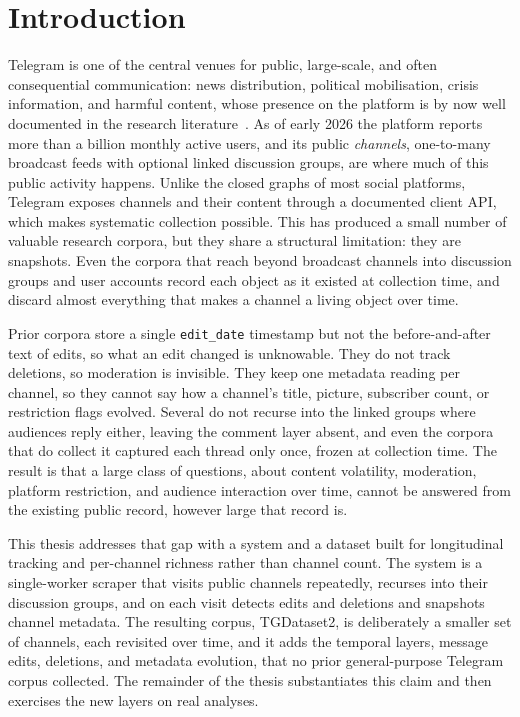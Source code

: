 \chapter{Introduction}
\label{chap:introduction}

Telegram is one of the central venues for public, large-scale, and often consequential communication: news distribution, political mobilisation, crisis information, and harmful content, whose presence on the platform is by now well documented in the research literature~\cite{baumgartner2020,walther2021,hoseini2024,propaganda2025}. As of early 2026 the platform reports more than a billion monthly active users, and its public \emph{channels}, one-to-many broadcast feeds with optional linked discussion groups, are where much of this public activity happens. Unlike the closed graphs of most social platforms, Telegram exposes channels and their content through a documented client API, which makes systematic collection possible. This has produced a small number of valuable research corpora, but they share a structural limitation: they are snapshots. Even the corpora that reach beyond broadcast channels into discussion groups and user accounts record each object as it existed at collection time, and discard almost everything that makes a channel a living object over time.

Prior corpora store a single \texttt{edit\_date} timestamp but not the before-and-after text of edits, so what an edit changed is unknowable. They do not track deletions, so moderation is invisible. They keep one metadata reading per channel, so they cannot say how a channel's title, picture, subscriber count, or restriction flags evolved. Several do not recurse into the linked groups where audiences reply either, leaving the comment layer absent, and even the corpora that do collect it captured each thread only once, frozen at collection time. The result is that a large class of questions, about content volatility, moderation, platform restriction, and audience interaction over time, cannot be answered from the existing public record, however large that record is.

This thesis addresses that gap with a system and a dataset built for longitudinal tracking and per-channel richness rather than channel count. The system is a single-worker scraper that visits public channels repeatedly, recurses into their discussion groups, and on each visit detects edits and deletions and snapshots channel metadata. The resulting corpus, TGDataset2, is deliberately a smaller set of channels, each revisited over time, and it adds the temporal layers, message edits, deletions, and metadata evolution, that no prior general-purpose Telegram corpus collected. The remainder of the thesis substantiates this claim and then exercises the new layers on real analyses.

